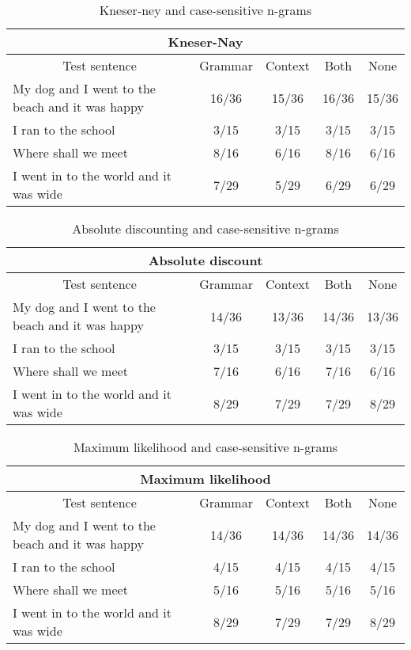 {\footnotesize
\begin{table}[H]
\centering
\caption{Kneser-ney and case-sensitive n-grams}
\begin{tabular}{ |p{}|c|c|c|c| }
	\hline
	\multicolumn{5}{|c|}{Kneser-Nay} \\
	\hline
	\multicolumn{1}{|c|}{Test sentence} & Grammar & Context & Both & None \\
	\hline
	My dog and I went to the beach and it was happy & 16/36 & 15/36 & 16/36 & 15/36 \\
	\hline
	I ran to the school & 3/15 & 3/15 & 3/15 & 3/15 \\
	\hline
	Where shall we meet & 8/16 & 6/16 & 8/16 & 6/16 \\
	\hline
	I went in to the world and it was wide & 7/29 & 5/29 & 6/29 & 6/29 \\
	\hline
\end{tabular}
\end{table}

\vspace{-1cm}
\begin{table}[H]
\centering
\caption{Absolute discounting and case-sensitive n-grams}
\begin{tabular}{ |p{}|c|c|c|c| }
	\hline
	\multicolumn{5}{|c|}{Absolute discount} \\
	\hline
	\multicolumn{1}{|c|}{Test sentence} & Grammar & Context & Both & None \\
	\hline
	My dog and I went to the beach and it was happy & 14/36 & 13/36 & 14/36 & 13/36 \\
	\hline
	I ran to the school & 3/15 & 3/15 & 3/15 & 3/15 \\
	\hline
	Where shall we meet & 7/16 & 6/16 & 7/16 & 6/16 \\
	\hline
	I went in to the world and it was wide & 8/29 & 7/29 & 7/29 & 8/29 \\
	\hline
\end{tabular}
\end{table}

\vspace{-1cm}
\begin{table}[H]
\centering
\caption{Maximum likelihood and case-sensitive n-grams}
\begin{tabular}{ |p{}|c|c|c|c| }
	\hline
	\multicolumn{5}{|c|}{Maximum likelihood} \\
	\hline
	\multicolumn{1}{|c|}{Test sentence} & Grammar & Context & Both & None \\
	\hline
	My dog and I went to the beach and it was happy & 14/36 & 14/36 & 14/36 & 14/36 \\
	\hline
	I ran to the school & 4/15 & 4/15 & 4/15 & 4/15 \\
	\hline
	Where shall we meet & 5/16 & 5/16 & 5/16 & 5/16 \\
	\hline
	I went in to the world and it was wide & 8/29 & 7/29 & 7/29 & 8/29 \\
	\hline
\end{tabular}
\end{table}
\vspace{-1cm}



}
